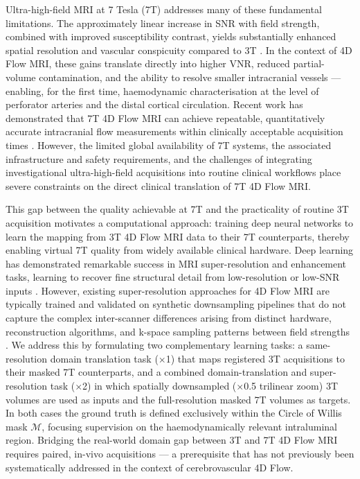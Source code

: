 Ultra-high-field MRI at 7 Tesla (7T) addresses many of these fundamental limitations. The approximately linear increase in SNR with field strength, combined with improved susceptibility contrast, yields substantially enhanced spatial resolution and vascular conspicuity compared to 3T \cite{kara2022_7t,smra2024}. In the context of 4D Flow MRI, these gains translate directly into higher VNR, reduced partial-volume contamination, and the ability to resolve smaller intracranial vessels --- enabling, for the first time, haemodynamic characterisation at the level of perforator arteries and the distal cortical circulation. Recent work has demonstrated that 7T 4D Flow MRI can achieve repeatable, quantitatively accurate intracranial flow measurements within clinically acceptable acquisition times \cite{mccormick2020_7t4dflow}. However, the limited global availability of 7T systems, the associated infrastructure and safety requirements, and the challenges of integrating investigational ultra-high-field acquisitions into routine clinical workflows place severe constraints on the direct clinical translation of 7T 4D Flow MRI.

This gap between the quality achievable at 7T and the practicality of routine 3T acquisition motivates a computational approach: training deep neural networks to learn the mapping from 3T 4D Flow MRI data to their 7T counterparts, thereby enabling virtual 7T quality from widely available clinical hardware. Deep learning has demonstrated remarkable success in MRI super-resolution and enhancement tasks, learning to recover fine structural detail from low-resolution or low-SNR inputs \cite{duffy2022sr,wang2024srrt}. However, existing super-resolution approaches for 4D Flow MRI are typically trained and validated on synthetic downsampling pipelines that do not capture the complex inter-scanner differences arising from distinct hardware, reconstruction algorithms, and k-space sampling patterns between field strengths \cite{ferdian2020,elahmar2023}. We address this by formulating two complementary learning tasks: a same-resolution domain translation task ($\times$1) that maps registered 3T acquisitions to their masked 7T counterparts, and a combined domain-translation and super-resolution task ($\times$2) in which spatially downsampled ($\times$0.5 trilinear zoom) 3T volumes are used as inputs and the full-resolution masked 7T volumes as targets. In both cases the ground truth is defined exclusively within the Circle of Willis mask $\mathcal{M}$, focusing supervision on the haemodynamically relevant intraluminal region. Bridging the real-world domain gap between 3T and 7T 4D Flow MRI requires paired, in-vivo acquisitions --- a prerequisite that has not previously been systematically addressed in the context of cerebrovascular 4D Flow.

